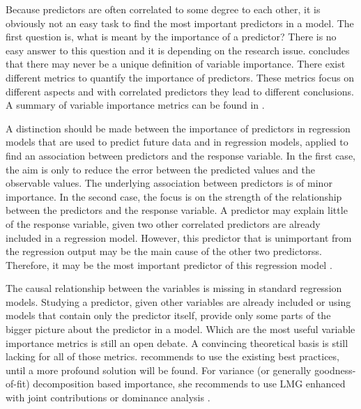 \documentclass[11pt,a4paper,twoside]{book}\usepackage[]{graphicx}\usepackage[]{color}
\begin{document}
Because predictors are often correlated to some degree to each other, it is obviously not an easy task to find the most important predictors in a model. The first question is, what is meant by the importance of a predictor? There is no easy answer to this question and it is depending on the research issue. \cite{Gromping2015} concludes that there may never be a unique definition of variable importance. There exist different metrics to quantify the importance of predictors. These metrics focus on different aspects and with correlated predictors they lead to different conclusions.  A summary of variable importance metrics can be found in  \cite{Gromping2015}.  

A distinction should be made between the importance of predictors in regression models that are used to predict future data and in regression models, applied to find an association between predictors and the response variable. In the first case, the aim is only to reduce the error between the predicted values and the observable values. The underlying association between predictors is of minor importance. In the second case, the focus is on the strength of the relationship between the predictors and the response variable. A predictor may explain little of the response variable, given two other correlated predictors are already included in a regression model. However, this predictor that is unimportant from the regression output may be the main cause  of the other two predictorss. Therefore, it may be the most important predictor of this regression model \citep{Gromping2007}. 

The causal relationship between the variables is missing in standard regression models. Studying a predictor, given other variables are already included or using models that contain only  the predictor itself,  provide only some parts of the bigger picture about the predictor in a model. Which  are the most useful variable importance metrics is still an open debate. A convincing theoretical basis is still lacking for all of those metrics.  \cite{Gromping2015} recommends to use the existing best practices, until a more profound solution will be found. For variance (or generally goodness-of-fit) decomposition based importance, she recommends to use LMG enhanced with joint contributions or dominance analysis \citep{Gromping2015}.








\end{document}
